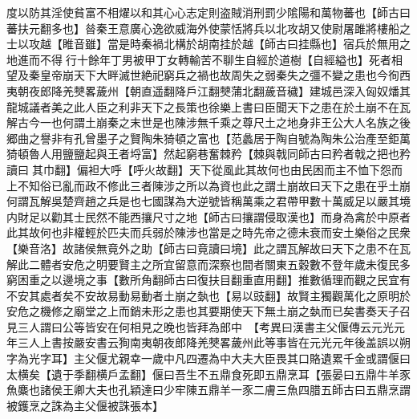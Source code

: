 度以防其淫使貧富不相燿以和其心心志定則盗賊消刑罰少隂陽和萬物蕃也【師古曰蕃扶元翻多也】㫺秦王意廣心逸欲威海外使蒙恬將兵以北攻胡又使尉屠雎將樓船之士以攻越【睢音雖】當是時秦禍北構於胡南挂於越【師古曰挂縣也】宿兵於無用之地進而不得行十餘年丁男被甲丁女轉輸苦不聊生自經於道樹【自經縊也】死者相望及秦皇帝崩天下大畔滅世絶祀窮兵之禍也故周失之弱秦失之彊不變之患也今徇西夷朝夜郎降羌僰畧薉州【朝直遥翻降戶江翻僰蒲北翻薉音穢】建城邑深入匈奴燔其龍城議者美之此人臣之利非天下之長策也徐樂上書曰臣聞天下之患在於土崩不在瓦解古今一也何謂土崩秦之末世是也陳涉無千乘之尊尺土之地身非王公大人名族之後郷曲之譽非有孔曾墨子之賢陶朱猗頓之富也【范蠡居于陶自號為陶朱公治產至鉅萬猗頓魯人用鹽鹽起與王者埒富】然起窮巷奮棘矜【棘與戟同師古曰矜者戟之把也矜讀曰其巾翻】偏袒大呼【呼火故翻】天下從風此其故何也由民困而主不恤下怨而上不知俗已亂而政不修此三者陳涉之所以為資也此之謂土崩故曰天下之患在乎土崩何謂瓦解吳楚齊趙之兵是也七國謀為大逆號皆稱萬乘之君帶甲數十萬威足以嚴其境内財足以勸其士民然不能西攘尺寸之地【師古曰攘謂侵取漢也】而身為禽於中原者此其故何也非權輕於匹夫而兵弱於陳涉也當是之時先帝之德未衰而安土樂俗之民衆【樂音洛】故諸侯無竟外之助【師古曰竟讀曰境】此之謂瓦解故曰天下之患不在瓦解此二體者安危之明要賢主之所宜留意而深察也間者關東五穀數不登年歲未復民多窮困重之以邊境之事【數所角翻師古曰復扶目翻重直用翻】推數循理而觀之民宜有不安其處者矣不安故易動易動者土崩之埶也【易以豉翻】故賢主獨觀萬化之原明於安危之機修之廟堂之上而銷未形之患也其要期使天下無土崩之埶而已矣書奏天子召見三人謂曰公等皆安在何相見之晚也皆拜為郎中　【考異曰漢書主父偃傳云元光元年三人上書按嚴安書云狥南夷朝夜郎降羌僰畧薉州此等事皆在元光元年後盖誤以朔字為光字耳】主父偃尤親幸一歲中凡四遷為中大夫大臣畏其口賂遺累千金或謂偃曰太横矣【遺于季翻横戶孟翻】偃曰吾生不五鼎食死即五鼎烹耳【張晏曰五鼎牛羊豕魚麋也諸侯王卿大夫也孔穎達曰少牢陳五鼎羊一豕二膚三魚四腊五師古曰五鼎烹謂被鑊烹之誅為主父偃被誅張本】

